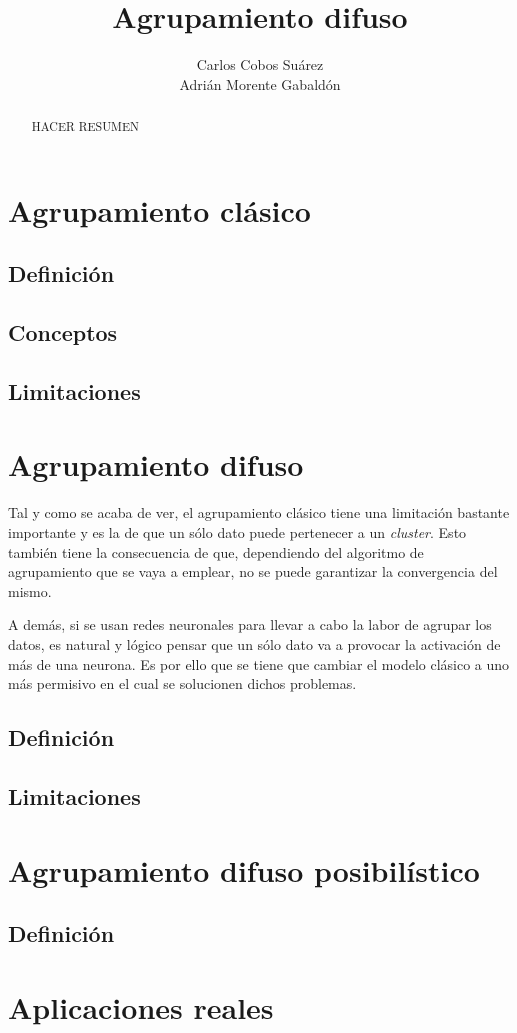\documentclass[]{report}
\title{Agrupamiento difuso}
\author{Carlos Cobos Suárez\\Adrián Morente Gabaldón}
\begin{document}
\maketitle

\begin{abstract}
	HACER RESUMEN
\end{abstract}

	\chapter{Agrupamiento clásico}
	
		\section{Definición}
		
		\section{Conceptos}
		
		\section{Limitaciones}
	
	\chapter{Agrupamiento difuso}
		Tal y como se acaba de ver, el agrupamiento clásico tiene una limitación bastante importante y es la de que un sólo dato puede pertenecer a un \textit{cluster}. Esto también tiene la consecuencia de que, dependiendo del algoritmo de agrupamiento que se vaya a emplear, no se puede garantizar la convergencia del mismo.
		
		A demás, si se usan redes neuronales para llevar a cabo la labor de agrupar los datos, es natural y lógico pensar que un sólo dato va a provocar la activación de más de una neurona. Es por ello que se tiene que cambiar el modelo clásico a uno más permisivo en el cual se solucionen dichos problemas.
			
		\section{Definición}
			
		
		\section{Limitaciones}
	
	\chapter{Agrupamiento difuso posibilístico}
	
		\section{Definición}
	
	\chapter{Aplicaciones reales}
	


\end{document}

